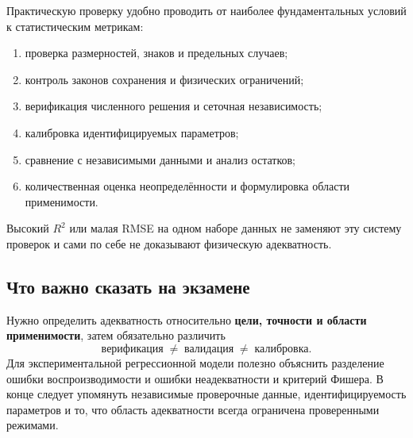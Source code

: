Практическую проверку удобно проводить от наиболее фундаментальных условий к
статистическим метрикам:
\begin{enumerate}
    \item проверка размерностей, знаков и предельных случаев;
    \item контроль законов сохранения и физических ограничений;
    \item верификация численного решения и сеточная независимость;
    \item калибровка идентифицируемых параметров;
    \item сравнение с независимыми данными и анализ остатков;
    \item количественная оценка неопределённости и формулировка области
    применимости.
\end{enumerate}
Высокий $R^2$ или малая RMSE на одном наборе данных не заменяют эту систему
проверок и сами по себе не доказывают физическую адекватность.

\subsection{Что важно сказать на экзамене}

Нужно определить адекватность относительно \textbf{цели, точности и области
применимости}, затем обязательно различить
\[
\boxed{\text{верификация}\;\neq\;\text{валидация}\;\neq\;\text{калибровка}}.
\]
Для экспериментальной регрессионной модели полезно объяснить разделение ошибки
воспроизводимости и ошибки неадекватности и критерий Фишера. В конце следует
упомянуть независимые проверочные данные, идентифицируемость параметров и то, что
область адекватности всегда ограничена проверенными режимами.

\newpage
